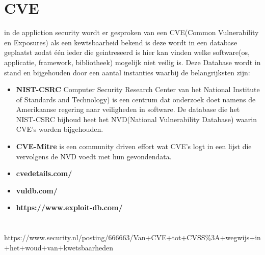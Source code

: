 \section{CVE}
in de appliction security wordt er gesproken van een CVE(Common Vulnerability en Exposures) als een kewtsbaarheid bekend is deze wordt in een database geplaatst zodat \'e\'en ieder die geintreseerd is hier kan vinden welke software(os, applicatie, framework, bibliotheek) mogelijk niet veilig is. Deze Database wordt in stand en bijgehouden door een aantal instanties waarbij de belangrijksten zijn:
\begin{itemize}
    \item \textbf{NIST-CSRC} Computer Security Research Center van het National Institute of Standards and Technology) is een centrum dat onderzoek doet namens de Amerikaanse regering naar veiligheden in software. De database die het NIST-CSRC bijhoud heet het NVD(National Vulnerability Database) waarin CVE's worden bijgehouden.
    \item \textbf{CVE-Mitre} is een community driven effort wat CVE's logt in een lijst die vervolgens de NVD voedt met hun gevondendata.
    \item \textbf{cvedetails.com/}
    \item \textbf{vuldb.com/}
    \item \textbf{https://www.exploit-db.com/}
\end{itemize}

\section{}

https://www.security.nl/posting/666663/Van+CVE+tot+CVSS\%3A+wegwijs+in+het+woud+van+kwetsbaarheden











\s
